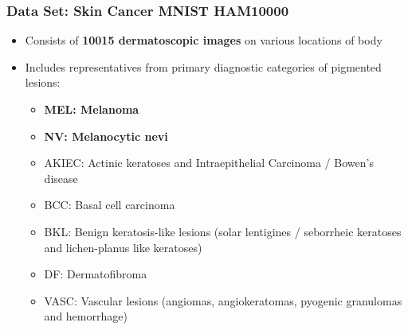 \documentclass[aspectratio=169]{beamer}
\begin{document}
\begin{frame}
\frametitle{Data Set: Skin Cancer MNIST HAM10000} %
\vspace*{-4mm}
\begin{itemize} \justifying
	\item Consists of {\bfseries \textcolor{UF_dark_blue}{10015 dermatoscopic images}} on various locations of body
	\item Includes representatives from primary diagnostic categories of pigmented lesions: 
	\begin{itemize}\justifying 
		\item {\bfseries \textcolor{UF_dark_blue}{MEL: Melanoma}}
		\item {\bfseries \textcolor{UF_dark_blue}{NV: Melanocytic nevi}}
		\item AKIEC: Actinic keratoses and Intraepithelial Carcinoma / Bowen's disease
		\item BCC: Basal cell carcinoma 
		\item BKL: Benign keratosis-like lesions (solar lentigines / seborrheic keratoses and lichen-planus like keratoses)
		\item DF: Dermatofibroma 
		\item VASC: Vascular lesions (angiomas, angiokeratomas, pyogenic granulomas and hemorrhage)
	\end{itemize}
\end{itemize}

\end{frame}
\end{document}
